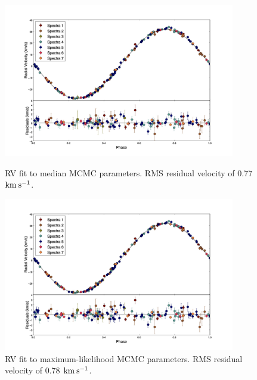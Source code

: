 \documentclass{article}
\begin{document}
\begin{figure}[!htb]
\centering
\includegraphics[width=0.9\textwidth]{RVfit_meds_100000_FixedEcc.jpg}
\caption{RV fit to median MCMC parameters. RMS residual velocity of 0.77 $\rm{km \: s^{-1}}$.}

\includegraphics[width=0.9\textwidth]{RVfit_best_100000_FixedEcc.jpg}
\caption{RV fit to maximum-likelihood MCMC parameters. RMS residual velocity of 0.78 $\rm{km \: s^{-1}}$.}
\end{figure}
\end{document}
